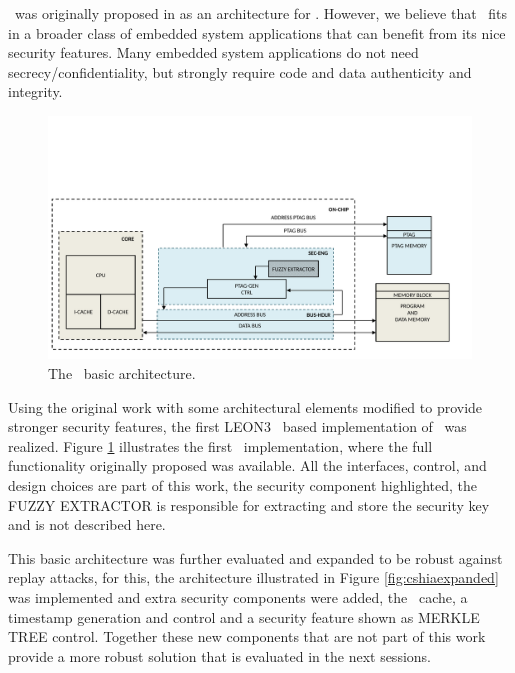 \cshia~was originally proposed in \cite{Hoffman2015} as an architecture for \iot. However, we believe that \cshia~fits in a broader class of embedded system applications that can benefit from its nice security features. Many embedded system applications do not need secrecy\slash{}confidentiality, but strongly require code and data authenticity and integrity. 
\begin{figure}[!ht]
    \centering
    \includegraphics[width=\textwidth]{figures/pdf/CSHIA_basic.pdf}
    \caption{The \cshia~basic architecture.}
    \label{fig:cshia}
\end{figure}
Using the original work with some architectural elements modified to provide stronger security features, the first LEON3 \fpga~based implementation of \cshia~was realized. Figure \ref{fig:cshia} illustrates  the first \cshia~implementation, where the full functionality originally proposed was available. All the interfaces, control, and design choices are part of this work, the security component highlighted, the FUZZY EXTRACTOR  is responsible for extracting and store the security key and is not described here.   

This basic architecture was further evaluated and expanded to be robust against replay attacks, for this,  the architecture illustrated in Figure \ref{fig:cshiaexpanded} was implemented and extra security components were added, the \ptag~cache, a timestamp generation and control and a security feature shown as MERKLE TREE control. Together these new components that are not part of this work provide a more robust solution that is evaluated in the next sessions. 



